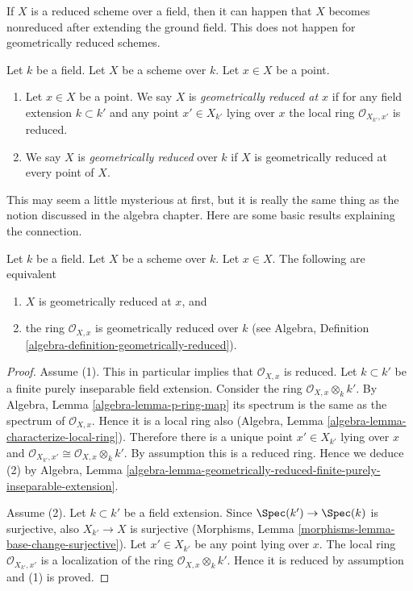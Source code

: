 \noindent
If $X$ is a reduced scheme over a field, then it can happen that $X$
becomes nonreduced after extending the ground field. This does not happen
for geometrically reduced schemes.

\begin{definition}
\label{definition-geometrically-reduced}
Let $k$ be a field.
Let $X$ be a scheme over $k$.
Let $x \in X$ be a point.
\begin{enumerate}
\item Let $x \in X$ be a point.
We say $X$ is {\it geometrically reduced at $x$}
if for any field extension $k \subset k'$
and any point $x' \in X_{k'}$ lying over $x$
the local ring $\mathcal{O}_{X_{k'}, x'}$ is reduced.
\item We say $X$ is {\it geometrically reduced} over $k$
if $X$ is geometrically reduced at every point of $X$.
\end{enumerate}
\end{definition}

\noindent
This may seem a little mysterious at first, but it is
really the same thing as the notion discussed in the algebra chapter.
Here are some basic results explaining the connection.

\begin{lemma}
\label{lemma-geometrically-reduced-at-point}
Let $k$ be a field.
Let $X$ be a scheme over $k$.
Let $x \in X$.
The following are equivalent
\begin{enumerate}
\item $X$ is geometrically reduced at $x$, and
\item the ring $\mathcal{O}_{X, x}$ is geometrically
reduced over $k$ (see
Algebra, Definition \ref{algebra-definition-geometrically-reduced}).
\end{enumerate}
\end{lemma}

\begin{proof}
Assume (1). This in particular implies that $\mathcal{O}_{X, x}$
is reduced. Let $k \subset k'$ be a finite purely inseparable field
extension. Consider the ring $\mathcal{O}_{X, x} \otimes_k k'$.
By Algebra, Lemma \ref{algebra-lemma-p-ring-map}
its spectrum is the same as the spectrum of $\mathcal{O}_{X, x}$.
Hence it is a local ring also
(Algebra, Lemma \ref{algebra-lemma-characterize-local-ring}).
Therefore there is a unique point $x' \in X_{k'}$ lying over $x$
and $\mathcal{O}_{X_{k'}, x'} \cong \mathcal{O}_{X, x} \otimes_k k'$.
By assumption this is a reduced ring. Hence we deduce (2) by
Algebra, Lemma
\ref{algebra-lemma-geometrically-reduced-finite-purely-inseparable-extension}.

\medskip\noindent
Assume (2). Let $k \subset k'$ be a field extension. Since
$\Spec(k') \to \Spec(k)$ is surjective, also
$X_{k'} \to X$ is surjective
(Morphisms, Lemma \ref{morphisms-lemma-base-change-surjective}).
Let $x' \in X_{k'}$ be any point lying over $x$.
The local ring $\mathcal{O}_{X_{k'}, x'}$
is a localization of the ring $\mathcal{O}_{X, x} \otimes_k k'$.
Hence it is reduced by assumption and (1) is proved.
\end{proof}

